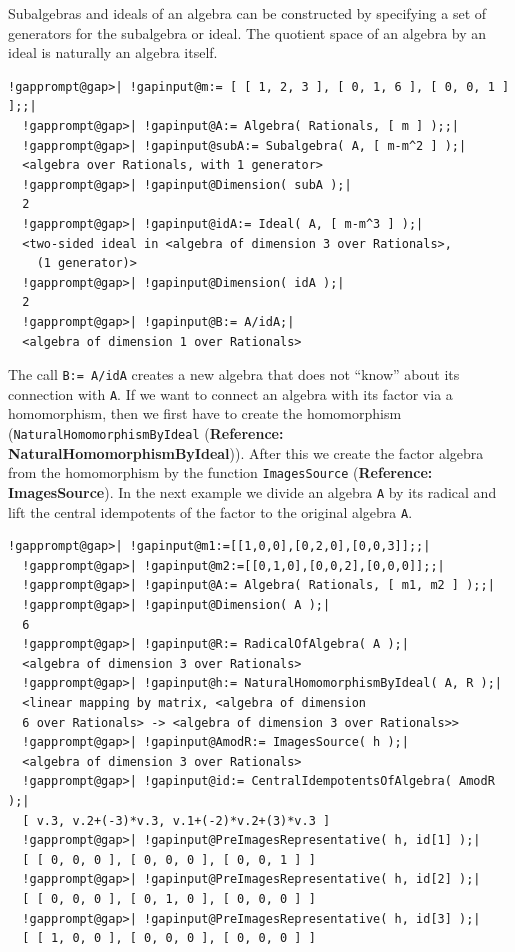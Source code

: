 \documentclass[a4paper,11pt]{report}
\begin{document}
{{ Subalgebras and ideals of an algebra can be constructed by specifying a set of
generators for the subalgebra or ideal. The quotient space of an algebra by an
ideal is naturally an algebra itself. 

 
\begin{Verbatim}[commandchars=!@|,fontsize=\small,frame=single,label=Example]
  !gapprompt@gap>| !gapinput@m:= [ [ 1, 2, 3 ], [ 0, 1, 6 ], [ 0, 0, 1 ] ];;|
  !gapprompt@gap>| !gapinput@A:= Algebra( Rationals, [ m ] );;|
  !gapprompt@gap>| !gapinput@subA:= Subalgebra( A, [ m-m^2 ] );|
  <algebra over Rationals, with 1 generator>
  !gapprompt@gap>| !gapinput@Dimension( subA );|
  2
  !gapprompt@gap>| !gapinput@idA:= Ideal( A, [ m-m^3 ] );|
  <two-sided ideal in <algebra of dimension 3 over Rationals>,
    (1 generator)>
  !gapprompt@gap>| !gapinput@Dimension( idA );|
  2
  !gapprompt@gap>| !gapinput@B:= A/idA;|
  <algebra of dimension 1 over Rationals>
\end{Verbatim}
 

 The call \texttt{B:= A/idA} creates a new algebra that does not ``know'' about its connection with \texttt{A}. If we want to connect an algebra with its factor via a homomorphism, then we
first have to create the homomorphism (\texttt{NaturalHomomorphismByIdeal} (\textbf{Reference: NaturalHomomorphismByIdeal})). After this we create the factor algebra from the homomorphism by the
function \texttt{ImagesSource} (\textbf{Reference: ImagesSource}). In the next example we divide an algebra \texttt{A} by its radical and lift the central idempotents of the factor to the original
algebra \texttt{A}. 

 
\begin{Verbatim}[commandchars=!@|,fontsize=\small,frame=single,label=Example]
  !gapprompt@gap>| !gapinput@m1:=[[1,0,0],[0,2,0],[0,0,3]];;|
  !gapprompt@gap>| !gapinput@m2:=[[0,1,0],[0,0,2],[0,0,0]];;|
  !gapprompt@gap>| !gapinput@A:= Algebra( Rationals, [ m1, m2 ] );;|
  !gapprompt@gap>| !gapinput@Dimension( A );|
  6
  !gapprompt@gap>| !gapinput@R:= RadicalOfAlgebra( A );|
  <algebra of dimension 3 over Rationals>
  !gapprompt@gap>| !gapinput@h:= NaturalHomomorphismByIdeal( A, R );|
  <linear mapping by matrix, <algebra of dimension
  6 over Rationals> -> <algebra of dimension 3 over Rationals>>
  !gapprompt@gap>| !gapinput@AmodR:= ImagesSource( h );|
  <algebra of dimension 3 over Rationals>
  !gapprompt@gap>| !gapinput@id:= CentralIdempotentsOfAlgebra( AmodR );|
  [ v.3, v.2+(-3)*v.3, v.1+(-2)*v.2+(3)*v.3 ]
  !gapprompt@gap>| !gapinput@PreImagesRepresentative( h, id[1] );|
  [ [ 0, 0, 0 ], [ 0, 0, 0 ], [ 0, 0, 1 ] ]
  !gapprompt@gap>| !gapinput@PreImagesRepresentative( h, id[2] );|
  [ [ 0, 0, 0 ], [ 0, 1, 0 ], [ 0, 0, 0 ] ]
  !gapprompt@gap>| !gapinput@PreImagesRepresentative( h, id[3] );|
  [ [ 1, 0, 0 ], [ 0, 0, 0 ], [ 0, 0, 0 ] ]
\end{Verbatim}
 

}}
\end{document}

